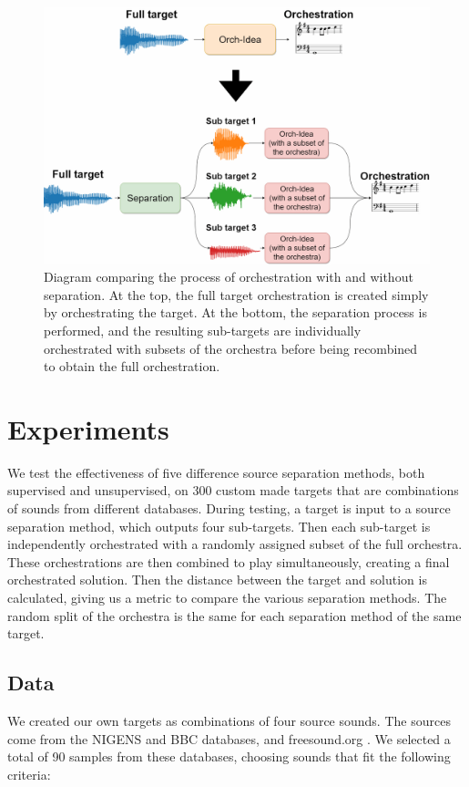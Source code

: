 \documentclass{article}
\begin{document}
	\begin{figure}[t]
		\centering
			\includegraphics[width=\columnwidth]{figures/diagram.png}
			\caption{Diagram comparing the process of orchestration with and without separation. At the top, the full target orchestration is created simply by orchestrating the target. At the bottom, the separation process is performed, and the resulting sub-targets are individually orchestrated with subsets of the orchestra before being recombined to obtain the full orchestration.}\label{fig:full_diagram}
	\end{figure}
	
	
	\section{Experiments}\label{sec:experiments}
	
	We test the effectiveness of five difference source separation methods, both supervised and unsupervised, on 300 custom made targets that are combinations of sounds from different databases. During testing, a target is input to a source separation method, which outputs four sub-targets. Then each sub-target is independently orchestrated with a randomly assigned subset of the full orchestra. These orchestrations are then combined to play simultaneously, creating a final orchestrated solution. Then the distance between the target and solution is calculated, giving us a metric to compare the various separation methods. The random split of the orchestra is the same for each separation method of the same target.
	
		\subsection{Data}\label{subsec:data}
		We created our own targets as combinations of four source sounds. The sources come from the NIGENS \cite{NIGENS} and BBC \cite{BBC} databases, and freesound.org \cite{freesound}. We selected a total of 90 samples from these databases, choosing sounds that fit the following criteria: 
		
\end{document}
